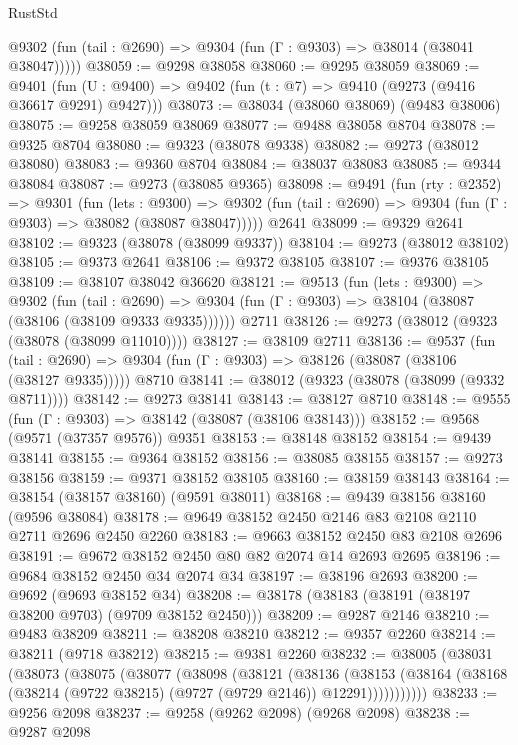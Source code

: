 \begin{lexlean}{RustStd}
\begin{coremodule}
{\begin{coremodule}
{{{{{{{{{{{{{{{{{{{{{{{{{{{{{{{{{{{{{{{{{{{{{{{{{{{{{{{      @9302 (fun (tail : @2690) => @9304 (fun (Γ : @9303) => @38014 (@38041 @38047)))))
@38059 := @9298 @38058
@38060 := @9295 @38059
@38069 := @9401
    (fun (U : @9400) => @9402 (fun (t : @7) => @9410 (@9273 (@9416 @36617 @9291) @9427)))
@38073 := @38034 (@38060 @38069) (@9483 @38006)
@38075 := @9258 @38059 @38069
@38077 := @9488 @38058 @8704
@38078 := @9325 @8704
@38080 := @9323 (@38078 @9338)
@38082 := @9273 (@38012 @38080)
@38083 := @9360 @8704
@38084 := @38037 @38083
@38085 := @9344 @38084
@38087 := @9273 (@38085 @9365)
@38098 := @9491
    (fun (rty : @2352) =>
    @9301
      (fun (lets : @9300) =>
      @9302 (fun (tail : @2690) => @9304 (fun (Γ : @9303) => @38082 (@38087 @38047)))))
    @2641
@38099 := @9329 @2641
@38102 := @9323 (@38078 (@38099 @9337))
@38104 := @9273 (@38012 @38102)
@38105 := @9373 @2641
@38106 := @9372 @38105
@38107 := @9376 @38105
@38109 := @38107 @38042 @36620
@38121 := @9513
    (fun (lets : @9300) =>
    @9302
      (fun (tail : @2690) =>
      @9304 (fun (Γ : @9303) => @38104 (@38087 (@38106 (@38109 @9333 @9335))))))
    @2711
@38126 := @9273 (@38012 (@9323 (@38078 (@38099 @11010))))
@38127 := @38109 @2711
@38136 := @9537
    (fun (tail : @2690) => @9304 (fun (Γ : @9303) => @38126 (@38087 (@38106 (@38127 @9335)))))
    @8710
@38141 := @38012 (@9323 (@38078 (@38099 (@9332 @8711))))
@38142 := @9273 @38141
@38143 := @38127 @8710
@38148 := @9555 (fun (Γ : @9303) => @38142 (@38087 (@38106 @38143)))
@38152 := @9568 (@9571 (@37357 @9576)) @9351
@38153 := @38148 @38152
@38154 := @9439 @38141
@38155 := @9364 @38152
@38156 := @38085 @38155
@38157 := @9273 @38156
@38159 := @9371 @38152 @38105
@38160 := @38159 @38143
@38164 := @38154 (@38157 @38160) (@9591 @38011)
@38168 := @9439 @38156 @38160 (@9596 @38084)
@38178 := @9649 @38152 @2450 @2146 @83 @2108 @2110 @2711 @2696 @2450 @2260
@38183 := @9663 @38152 @2450 @83 @2108 @2696
@38191 := @9672 @38152 @2450 @80 @82 @2074 @14 @2693 @2695
@38196 := @9684 @38152 @2450 @34 @2074 @34
@38197 := @38196 @2693
@38200 := @9692 (@9693 @38152 @34)
@38208 := @38178 (@38183 (@38191 (@38197 @38200 @9703) (@9709 @38152 @2450)))
@38209 := @9287 @2146
@38210 := @9483 @38209
@38211 := @38208 @38210
@38212 := @9357 @2260
@38214 := @38211 (@9718 @38212)
@38215 := @9381 @2260
@38232 := @38005
    (@38031
      (@38073
        (@38075
          (@38077
            (@38098
              (@38121
                (@38136
                  (@38153
                    (@38164 (@38168 (@38214 (@9722 @38215) (@9727 (@9729 @2146)) @12291)))))))))))
@38233 := @9256 @2098
@38237 := @9258 (@9262 @2098) (@9268 @2098)
@38238 := @9287 @2098
}}}}}}}}}}}}}}}}}}}}}}}}}}}}}}}}}}}}}}}}}}}}}}}}}}}}}}}
\end{coremodule}}
\end{coremodule}
\end{lexlean}
